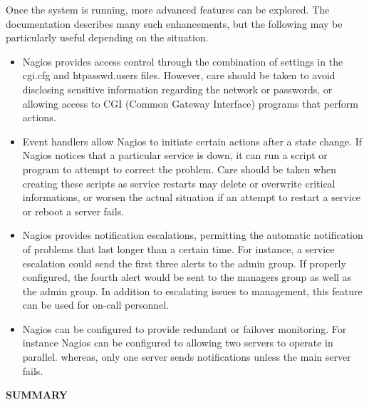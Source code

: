 \documentclass[english]{tktltiki2}
\theoremstyle{definition}
\theoremstyle{remark}
\begin{document}
Once the system is running, more advanced features can be explored. The documentation describes many such enhancements, but the following may be particularly useful depending on the situation.

\begin{itemize}
\item Nagios provides access control through the combination of settings in the cgi.cfg and htpasswd.users files. However, care should be taken to avoid disclosing sensitive information regarding the network or passwords, or allowing access to CGI (Common Gateway Interface) programs that perform actions.
\end{itemize}

\begin{itemize}
\item  Event handlers allow Nagios to initiate certain actions after a state change. If Nagios notices that a particular service is down, it can run a script or program to attempt to correct the problem. Care should be taken when creating these scripts as service restarts may delete or overwrite  critical informations, or worsen the actual situation if an attempt to restart a service or reboot a server fails.
\end{itemize}

\begin{itemize}
\item Nagios provides notification escalations, permitting the automatic notification of problems that last longer than a certain time. For instance, a service escalation could send the first three alerts to the admin group. If properly configured, the fourth alert would be sent to the managers group as well as the admin group. In addition to escalating issues to management, this feature can be used for on-call personnel.
\end{itemize}

\begin{itemize}
\item Nagios can be configured to provide redundant or failover monitoring. For instance Nagios can be configured to allowing two servers to operate in parallel. whereas, only one server sends notifications unless the main server fails.
\end{itemize}

\pagebreak

\begin{flushleft}
\textbf{SUMMARY}
\end{flushleft}
\end{document}
